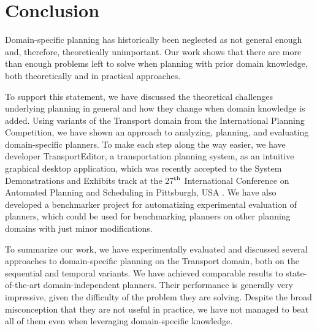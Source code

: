 \chapter*{Conclusion}

Domain-specific planning has historically been neglected as not general enough
and, therefore, theoretically unimportant.
Our work shows that there are more than enough problems
left to solve when planning with prior domain knowledge,
both theoretically and in practical approaches.

To support this statement,
we have discussed the theoretical challenges underlying
planning in general and how they change when
domain knowledge is added.
Using variants of the Transport domain from the International Planning Competition,
we have shown an approach to analyzing,
planning, and evaluating domain-specific planners.
To make each step along the way easier, we have developer TransportEditor,
a transportation planning system, as an intuitive graphical desktop application,
which was recently accepted to the System Demonstrations and Exhibits
track at the 27$^{\textrm{th}}$ International Conference on Automated Planning and Scheduling
in Pittsburgh, USA \citep{Skopek2017}. We have also developed a benchmarker project
for automatizing experimental evaluation of planners, which could be used for benchmarking planners on
other planning domains with just minor modifications.

To summarize our work, we have experimentally evaluated and discussed several approaches to
domain-specific planning on the Transport domain, both on the sequential and temporal
variants.
We have achieved comparable results to state-of-the-art domain-independent planners. Their performance is generally very impressive, given the difficulty of the problem they are solving. Despite the broad misconception that they are not useful in practice,
we have not managed to beat all of them even when leveraging domain-specific knowledge.

